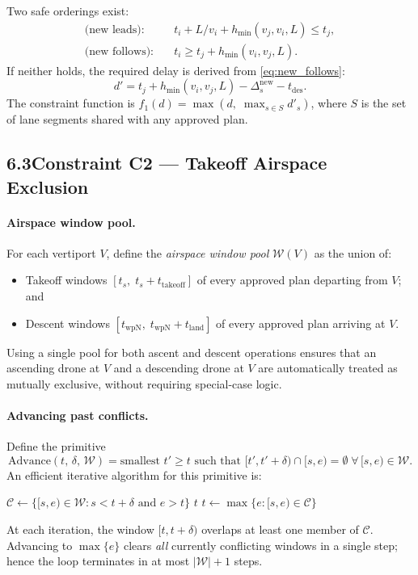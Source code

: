 \documentclass[12pt,a4paper]{article}
\newcommand{\hmin}{h_{\min}}
\newcommand{\twpN}{t_{\mathrm{wpN}}}
\newcommand{\tto}{t_{\mathrm{takeoff}}}
\newcommand{\tland}{t_{\mathrm{land}}}
\begin{document}
Two safe orderings exist:
\begin{align}
  \text{(new leads):}\quad & t_i + L/v_i + \hmin(v_j, v_i, L) \le t_j,
  \label{eq:new_leads}\\
  \text{(new follows):}\quad & t_i \ge t_j + \hmin(v_i, v_j, L).
  \label{eq:new_follows}
\end{align}
If neither holds, the required delay is derived from \eqref{eq:new_follows}:
\begin{equation}
  d' = t_j + \hmin(v_i, v_j, L) - \Delta_s^{\mathrm{new}} - t_{\mathrm{des}}.
  \label{eq:c1_delay}
\end{equation}
The constraint function is $f_1(d) = \max(d,\; \max_{s\in S} d'_s)$, where
$S$ is the set of lane segments shared with any approved plan.

\bigskip
\subsection*{6.3\quad Constraint C2 — Takeoff Airspace Exclusion}

\paragraph{Airspace window pool.}
For each vertiport $V$, define the \emph{airspace window pool}
$\mathcal{W}(V)$ as the union of:
\begin{itemize}
  \item Takeoff windows $[t_s,\; t_s + \tto]$ of every approved plan departing
    from $V$; and
  \item Descent windows $[\twpN,\; \twpN + \tland]$ of every approved plan
    arriving at $V$.
\end{itemize}
Using a single pool for both ascent and descent operations ensures that an
ascending drone at $V$ and a descending drone at $V$ are automatically
treated as mutually exclusive, without requiring special-case logic.

\paragraph{Advancing past conflicts.}
Define the primitive
\[
  \mathrm{Advance}(t,\, \delta,\, \mathcal{W})
  = \text{smallest } t' \ge t \text{ such that }
    [t', t'+\delta) \cap [s,e) = \emptyset \;\forall\, [s,e)\in\mathcal{W}.
\]
An efficient iterative algorithm for this primitive is:
\begin{algorithm}[H]
\caption{$\mathrm{Advance}(t, \delta, \mathcal{W})$}
\begin{algorithmic}[1]
  \State $\mathcal{C} \gets \{[s,e)\in\mathcal{W} : s < t + \delta \text{ and } e > t\}$
   \Return $t$ \EndIf
  \State $t \gets \max\{e : [s,e) \in \mathcal{C}\}$
\EndFor
\end{algorithmic}
\end{algorithm}
\noindent
At each iteration, the window $[t, t+\delta)$ overlaps at least one member of
$\mathcal{C}$.  Advancing to $\max\{e\}$ clears \emph{all} currently
conflicting windows in a single step; hence the loop terminates in at most
$|\mathcal{W}|+1$ steps.
\end{document}
